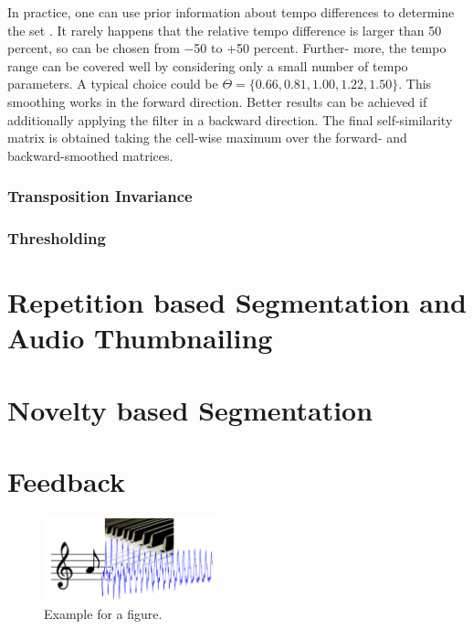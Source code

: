 \documentclass[a4paper, 9pt, twocolumn]{extarticle}
\begin{document}
In practice, one can use prior information about tempo differences to determine the set \Theta. It rarely happens that the relative tempo difference is larger than 50 percent, so \Theta can be chosen from −50 to +50 percent. Further-
more, the tempo range can be covered well by considering only a small number of tempo parameters. A typical choice could be  $\Theta=\{0.66, 0.81, 1.00, 1.22, 1.50\}$.
This smoothing works in the forward direction. Better results can be achieved if additionally applying the filter in a backward direction. The final self-similarity matrix is obtained taking the cell-wise maximum over the forward- and backward-smoothed matrices. 


\subsubsection{Transposition Invariance}
\label{subsubsection:ssmEnhancementTransInvariance}

\subsubsection{Thresholding}
\label{subsubsection:ssmEnhancementThresholding}
\section{Repetition based Segmentation and Audio Thumbnailing}
\label{section:repetition}

\section{Novelty based Segmentation}
\label{section:novelty}


\section{Feedback}
\label{section:feedback}


 \begin{figure}[h]
 \begin{center}
 \includegraphics[width=5cm]{images/figure_example.png}
 \end{center}
 \caption{
 Example for a figure.
 }
 \label{figure:example}
 \end{figure}
\end{document}
